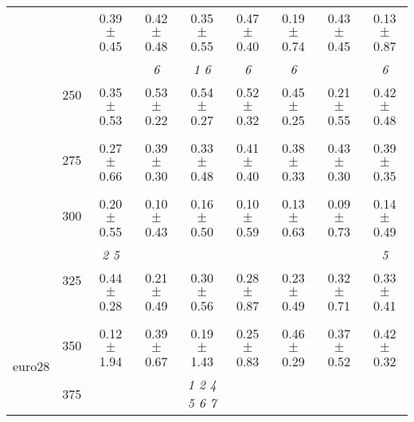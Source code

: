 \begin{table}[h]
{\begin{tabular}{
        ccccccccc}
 & & \cellcolor[HTML]{EFEFEF} 0.39 $\pm$ 0.45& \cellcolor[HTML]{EFEFEF} 0.42 $\pm$ 0.48& \cellcolor[HTML]{EFEFEF} 0.35 $\pm$ 0.55& \cellcolor[HTML]{EFEFEF} 0.47 $\pm$ 0.40& \cellcolor[HTML]{EFEFEF} 0.19 $\pm$ 0.74& \cellcolor[HTML]{EFEFEF} 0.43 $\pm$ 0.45& \cellcolor[HTML]{EFEFEF} 0.13 $\pm$ 0.87 \\ 
 & \multirow{2}{*}{250}& & \textit{ 6 }& \textit{ 1 6 }& \textit{ 6 }& \textit{ 6 }& & \textit{ 6 } \\ 
 & & 0.35 $\pm$ 0.53& 0.53 $\pm$ 0.22& 0.54 $\pm$ 0.27& 0.52 $\pm$ 0.32& 0.45 $\pm$ 0.25& 0.21 $\pm$ 0.55& 0.42 $\pm$ 0.48 \\ 
 & \multirow{2}{*}{275}& \cellcolor[HTML]{EFEFEF} & \cellcolor[HTML]{EFEFEF} & \cellcolor[HTML]{EFEFEF} & \cellcolor[HTML]{EFEFEF} & \cellcolor[HTML]{EFEFEF} & \cellcolor[HTML]{EFEFEF} & \cellcolor[HTML]{EFEFEF}  \\ 
 & & \cellcolor[HTML]{EFEFEF} 0.27 $\pm$ 0.66& \cellcolor[HTML]{EFEFEF} 0.39 $\pm$ 0.30& \cellcolor[HTML]{EFEFEF} 0.33 $\pm$ 0.48& \cellcolor[HTML]{EFEFEF} 0.41 $\pm$ 0.40& \cellcolor[HTML]{EFEFEF} 0.38 $\pm$ 0.33& \cellcolor[HTML]{EFEFEF} 0.43 $\pm$ 0.30& \cellcolor[HTML]{EFEFEF} 0.39 $\pm$ 0.35 \\ 
 & \multirow{2}{*}{300}& & & & & & &  \\ 
 & & 0.20 $\pm$ 0.55& 0.10 $\pm$ 0.43& 0.16 $\pm$ 0.50& 0.10 $\pm$ 0.59& 0.13 $\pm$ 0.63& 0.09 $\pm$ 0.73& 0.14 $\pm$ 0.49 \\ 
 & \multirow{2}{*}{325}& \cellcolor[HTML]{EFEFEF} \textit{ 2 5 }& \cellcolor[HTML]{EFEFEF} & \cellcolor[HTML]{EFEFEF} & \cellcolor[HTML]{EFEFEF} & \cellcolor[HTML]{EFEFEF} & \cellcolor[HTML]{EFEFEF} & \cellcolor[HTML]{EFEFEF} \textit{ 5 } \\ 
 & & \cellcolor[HTML]{EFEFEF} 0.44 $\pm$ 0.28& \cellcolor[HTML]{EFEFEF} 0.21 $\pm$ 0.49& \cellcolor[HTML]{EFEFEF} 0.30 $\pm$ 0.56& \cellcolor[HTML]{EFEFEF} 0.28 $\pm$ 0.87& \cellcolor[HTML]{EFEFEF} 0.23 $\pm$ 0.49& \cellcolor[HTML]{EFEFEF} 0.32 $\pm$ 0.71& \cellcolor[HTML]{EFEFEF} 0.33 $\pm$ 0.41 \\ 
 \multirow{4}{*}{euro28} & \multirow{2}{*}{350}& & & & & & &  \\ 
 & & 0.12 $\pm$ 1.94& 0.39 $\pm$ 0.67& 0.19 $\pm$ 1.43& 0.25 $\pm$ 0.83& 0.46 $\pm$ 0.29& 0.37 $\pm$ 0.52& 0.42 $\pm$ 0.32 \\ 
 & \multirow{2}{*}{375}& \cellcolor[HTML]{EFEFEF} & \cellcolor[HTML]{EFEFEF} & \cellcolor[HTML]{EFEFEF} \textit{ 1 2 4 5 6 7 }& \cellcolor[HTML]{EFEFEF} & \cellcolor[HTML]{EFEFEF} & \cellcolor[HTML]{EFEFEF} & \cellcolor[HTML]{EFEFEF}  \\ 

\end{tabular}}
\end{table}

